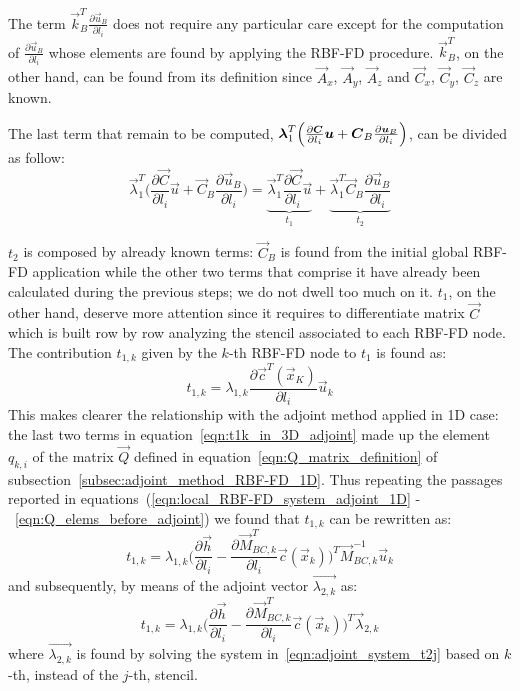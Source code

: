 \medskip
The term $\vec{k}_B^T \frac{\partial \vec{u}_B}{\partial l_i}$ does not require any particular care except for the computation of $\frac{\partial \vec{u}_B}{\partial l_i}$ whose elements are found by applying the RBF-FD procedure. $\vec{k}_B^T$, on the other hand, can be found from its definition since $\vec{A}_x$, $\vec{A}_y$, $\vec{A}_z$ and $\vec{C}_x$, $\vec{C}_y$, $\vec{C}_z$ are known.

\medskip
The last term that remain to be computed, $\vec{\lambda}_1^T \Bigl( \frac{\partial \vec{C}}{\partial l_i}\vec{u} + \vec{C}_B\frac{\partial \vec{u}_B}{\partial l_i} \Bigr)$, can be divided as follow:
\begin{equation}
	\vec{\lambda}_1^T \biggl( \frac{\partial \vec{C}}{\partial l_i}\vec{u} + \vec{C}_B\frac{\partial \vec{u}_B}{\partial l_i} \biggr) = \underbrace{\vec{\lambda}_1^T \frac{\partial \vec{C}}{\partial l_i} \vec{u}}_{t_1} + \underbrace{\vec{\lambda}_1^T \vec{C}_B \frac{\partial \vec{u}_B}{\partial l_i}}_{t_2}
\end{equation}

$t_2$ is composed by already known terms: $\vec{C}_B$ is found from the initial global RBF-FD application while the other two terms that comprise it have already been calculated during the previous steps; we do not dwell too much on it. $t_1$, on the other hand, deserve more attention since it requires to differentiate matrix $\vec{C}$ which is built row by row analyzing the stencil associated to each RBF-FD node.
The contribution $t_{1,k}$ given by the $k$-th RBF-FD node to $t_1$ is found as:
\begin{equation}
	\label{eqn:t1k_in_3D_adjoint}
	t_{1,k} = \lambda_{1,k} \frac{\partial \vec{c}^T(\vec{x}_K)}{\partial l_i} \vec{u}_k
\end{equation}
This makes clearer the relationship with the adjoint method applied in 1D case: the last two terms in equation~\eqref{eqn:t1k_in_3D_adjoint} made up the element $q_{k,i}$ of the matrix $\vec{Q}$ defined in equation~\eqref{eqn:Q_matrix_definition} of subsection~\ref{subsec:adjoint_method_RBF-FD_1D}. Thus repeating the passages reported in equations~(\ref{eqn:local_RBF-FD_system_adjoint_1D} -~\ref{eqn:Q_elems_before_adjoint}) we found that $t_{1,k}$ can be rewritten as:
\begin{equation}
	 t_{1,k} = \lambda_{1,k} \biggl( \frac{\partial \vec{h}}{\partial l_i} - \frac{\partial \vec{M}_{BC,k}^T}{\partial l_i} \vec{c}(\vec{x}_k) \biggr)^T \vec{M}_{BC,k}^{-1} \vec{u}_k
\end{equation}
and subsequently, by means of the adjoint vector $\vec{\lambda_{2,k}}$ as:
\begin{equation}
	t_{1,k} = \lambda_{1,k} \biggl( \frac{\partial \vec{h}}{\partial l_i} - \frac{\partial \vec{M}_{BC,k}^T}{\partial l_i} \vec{c}(\vec{x}_k) \biggr)^T \vec{\lambda}_{2,k}
\end{equation}
where $\vec{\lambda_{2,k}}$ is found by solving the system in~\eqref{eqn:adjoint_system_t2j} based on $k$-th, instead of the $j$-th, stencil.

